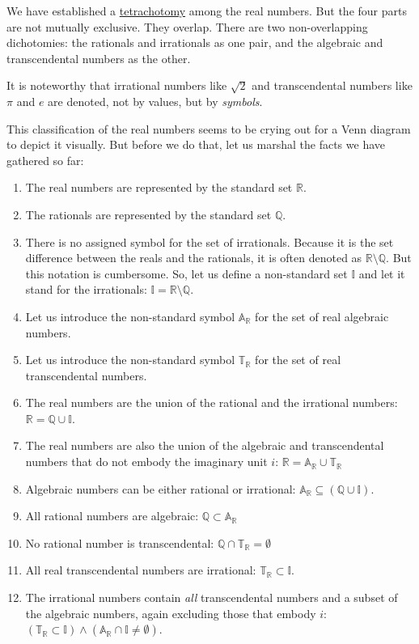 \documentclass[
  a4paper,
]{article}
\begin{document}
We have established a
\href{https://www.collinsdictionary.com/dictionary/english/tetrachotomy}{tetrachotomy}
among the real numbers. But the four parts are not mutually exclusive.
They overlap. There are two non-overlapping dichotomies: the rationals
and irrationals as one pair, and the algebraic and transcendental
numbers as the other.

It is noteworthy that irrational numbers like \(\sqrt{2}\) and
transcendental numbers like \(\pi\) and \(e\) are denoted, not by
values, but by \emph{symbols}.

This classification of the real numbers seems to be crying out for a
Venn diagram to depict it visually. But before we do that, let us
marshal the facts we have gathered so far:

\begin{enumerate}
\item
  The real numbers are represented by the standard set \(\mathbb{R}\).
\item
  The rationals are represented by the standard set \(\mathbb{Q}\).
\item
  There is no assigned symbol for the set of irrationals. Because it is
  the set difference between the reals and the rationals, it is often
  denoted as \(\mathbb{R}\setminus\mathbb{Q}\). But this notation is
  cumbersome. So, let us define a non-standard set \(\mathbb{I}\) and
  let it stand for the irrationals:
  \(\mathbb{I} = \mathbb{R}\setminus\mathbb{Q}\).
\item
  Let us introduce the non-standard symbol \(\mathbb{A_{\mathbb{R}}}\)
  for the set of real algebraic numbers.
\item
  Let us introduce the non-standard symbol \(\mathbb{T_{\mathbb{R}}}\)
  for the set of real transcendental numbers.
\item
  The real numbers are the union of the rational and the irrational
  numbers: \(\mathbb{R} = \mathbb{Q} \cup \mathbb{I}\).
\item
  The real numbers are also the union of the algebraic and
  transcendental numbers that do not embody the imaginary unit \(i\):
  \(\mathbb{R} = \mathbb{A_{\mathbb{R}}} \cup \mathbb{T_{\mathbb{R}}}\)
\item
  Algebraic numbers can be either rational or irrational:
  \(\mathbb{A_{\mathbb{R}}} \subseteq (\mathbb{Q} \cup \mathbb{I})\).
\item
  All rational numbers are algebraic:
  \(\mathbb{Q} \subset \mathbb{A_{\mathbb{R}}}\)
\item
  No rational number is transcendental:
  \(\mathbb{Q} \cap \mathbb{T_{\mathbb{R}}} = \emptyset\)
\item
  All real transcendental numbers are irrational:
  \(\mathbb{T_{\mathbb{R}}} \subset \mathbb{I}\).
\item
  The irrational numbers contain \emph{all} transcendental numbers and a
  subset of the algebraic numbers, again excluding those that embody
  \(i\): \((\mathbb{T_{\mathbb{R}}} \subset \mathbb{I})
  \wedge (\mathbb{A}_{\mathbb{R}} \cap \mathbb{I} \neq \emptyset)\).
\end{enumerate}
\end{document}
